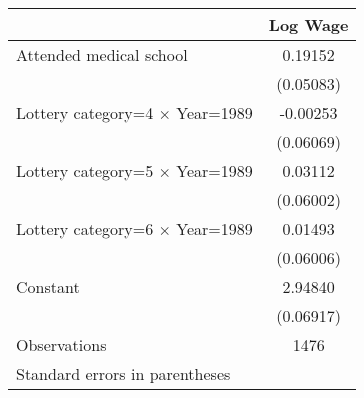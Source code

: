 \begin{tabular}{l*{1}{c}}
\hline\hline
                    &\multicolumn{1}{c}{Log Wage}\\
\hline
Attended medical school&     0.19152\\
                    &   (0.05083)\\
[1em]
Lottery category=4 $\times$ Year=1989&    -0.00253\\
                    &   (0.06069)\\
[1em]
Lottery category=5 $\times$ Year=1989&     0.03112\\
                    &   (0.06002)\\
[1em]
Lottery category=6 $\times$ Year=1989&     0.01493\\
                    &   (0.06006)\\
[1em]
Constant            &     2.94840\\
                    &   (0.06917)\\
\hline
Observations        &        1476\\
\hline\hline
\multicolumn{2}{l}{\footnotesize Standard errors in parentheses}\\
\end{tabular}
